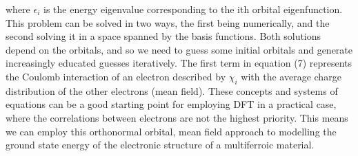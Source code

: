 \documentclass[10pt]{article}
\begin{document}
where $\epsilon_i$ is the energy eigenvalue corresponding to the ith orbital eigenfunction. This problem can be solved in two ways, the first being numerically, and the second solving it in a space spanned by the basis functions. Both solutions depend on the orbitals, and so we need to guess some initial orbitals and generate increasingly educated guesses iteratively. The first term in equation (7) represents the Coulomb interaction of an electron described by $\chi_i$ with the average charge distribution of the other electrons (mean field). These concepts and systems of equations can be a good starting point for employing DFT in a practical case, where the correlations between electrons are not the highest priority. This means we can employ this orthonormal orbital, mean field approach to modelling the ground state energy of the electronic structure of a multiferroic material.





\end{document}
